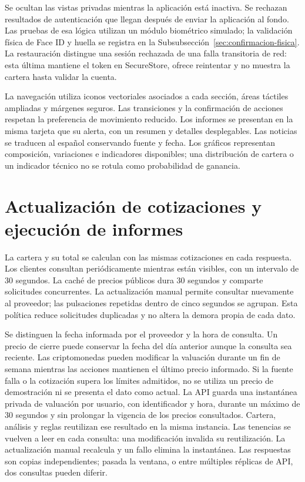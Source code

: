 Se ocultan las vistas privadas mientras la aplicación está inactiva. Se rechazan resultados de autenticación que llegan después de enviar la aplicación al fondo. Las pruebas de esa lógica utilizan un módulo biométrico simulado; la validación física de Face ID y huella se registra en la Subsubsección~\ref{sec:confirmacion-fisica}. La restauración distingue una sesión rechazada de una falla transitoria de red: esta última mantiene el token en SecureStore, ofrece reintentar y no muestra la cartera hasta validar la cuenta.

La navegación utiliza iconos vectoriales asociados a cada sección, áreas táctiles ampliadas y márgenes seguros. Las transiciones y la confirmación de acciones respetan la preferencia de movimiento reducido. Los informes se presentan en la misma tarjeta que su alerta, con un resumen y detalles desplegables. Las noticias se traducen al español conservando fuente y fecha. Los gráficos representan composición, variaciones e indicadores disponibles; una distribución de cartera o un indicador técnico no se rotula como probabilidad de ganancia.

\section{Actualización de cotizaciones y ejecución de informes}\label{sec:actualizacion-operativa}

La cartera y su total se calculan con las mismas cotizaciones en cada respuesta. Los clientes consultan periódicamente mientras están visibles, con un intervalo de 30 segundos. La caché de precios públicos dura 30 segundos y comparte solicitudes concurrentes. La actualización manual permite consultar nuevamente al proveedor; las pulsaciones repetidas dentro de cinco segundos se agrupan. Esta política reduce solicitudes duplicadas y no altera la demora propia de cada dato.

Se distinguen la fecha informada por el proveedor y la hora de consulta. Un precio de cierre puede conservar la fecha del día anterior aunque la consulta sea reciente. Las criptomonedas pueden modificar la valuación durante un fin de semana mientras las acciones mantienen el último precio informado. Si la fuente falla o la cotización supera los límites admitidos, no se utiliza un precio de demostración ni se presenta el dato como actual. La API guarda una instantánea privada de valuación por usuario, con identificador y hora, durante un máximo de 30 segundos y sin prolongar la vigencia de los precios consultados. Cartera, análisis y reglas reutilizan ese resultado en la misma instancia. Las tenencias se vuelven a leer en cada consulta: una modificación invalida su reutilización. La actualización manual recalcula y un fallo elimina la instantánea. Las respuestas son copias independientes; pasada la ventana, o entre múltiples réplicas de API, dos consultas pueden diferir.

